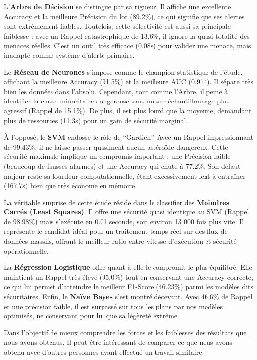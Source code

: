 \documentclass[11pt]{article}
\begin{document}
L'\textbf{Arbre de Décision} se distingue par sa rigueur. Il affiche une
excellente Accuracy et la meilleure Précision du lot (89.2\%), ce qui
signifie que ses alertes sont extrêmement fiables. Toutefois, cette
sélectivité est aussi sa principale faiblesse : avec un Rappel
catastrophique de 13.6\%, il ignore la quasi-totalité des menaces
réelles. C'est un outil très efficace (0.08s) pour valider une menace,
mais inadapté comme système d'alerte primaire.

Le \textbf{Réseau de Neurones} s'impose comme le champion statistique de
l'étude, affichant la meilleure Accuracy (91.5\%) et la meilleure AUC
(0.914). Il sépare très bien les données dans l'absolu. Cependant, tout
comme l'Arbre, il peine à identifier la classe minoritaire dangereuse
sans un sur-échantillonnage plus agressif (Rappel de 15.1\%). De plus,
il est plus lourd que la moyenne, demandant plus de ressources (11.3s)
pour un gain de sécurité marginal.

À l'opposé, le \textbf{SVM} endosse le rôle de ``Gardien''. Avec un
Rappel impressionnant de 99.43\%, il ne laisse passer quasiment aucun
astéroïde dangereux. Cette sécurité maximale implique un compromis
important : une Précision faible (beaucoup de fausses alarmes) et une
Accuracy qui chute à 77.2\%. Son défaut majeur reste sa lourdeur
computationnelle, étant excessivement lent à entraîner (167.7s) bien que
très économe en mémoire.

La véritable surprise de cette étude réside dans le classifier des
\textbf{Moindres Carrés (Least Squares)}. Il offre une sécurité quasi
identique au SVM (Rappel de 98.98\%) mais s'exécute en 0.01 seconde,
soit environ 13 000 fois plus vite. Il représente le candidat idéal pour
un traitement temps réel sur des flux de données massifs, offrant le
meilleur ratio entre vitesse d'exécution et sécurité opérationnelle.

La \textbf{Régression Logistique} offre quant à elle le compromit le
plus équilibré. Elle maintient un Rappel très élevé (95.0\%) tout en
conservant une Accuracy correcte, ce qui lui permet d'atteindre le
meilleur F1-Score (46.23\%) parmi les modèles dits sécuritaires. Enfin,
le \textbf{Naïve Bayes} s'est montré décevant. Avec 46.6\% de Rappel et
une précision faible, il est surpassé sur tous les plans par nos modèles
optimisés, ne conservant pour lui que sa légèreté extrême.

Dans l'objectif de mieux comprendre les forces et les faiblesses des
résultats que nous avons obtenus. Il peut être intéressant de comparer
ce que nous avons obtenu avec d'autres personnes ayant effectué un
travail similaire.
\end{document}
